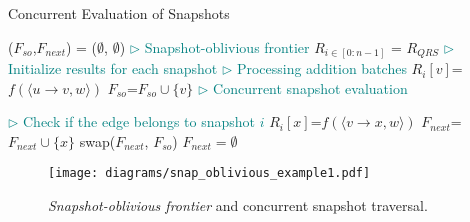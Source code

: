 \begin{algorithm}[t]
\caption{Concurrent Evaluation of Snapshots}
\label{algo:concurrent-snapshot}
\begin{algorithmic}[1]
\fontsize{8}{8.5}
\selectfont
{}
\State ($F_{so}$,$F_{next}$) = ($\emptyset$, $\emptyset$) \textcolor{teal}{ $\rhd$  Snapshot-oblivious frontier }
\State $R_{i\in [0:n-1]}$ = $R_{QRS}$ \textcolor{teal}{ $\rhd$  Initialize results for each snapshot  }
 \textcolor{teal}{ $\rhd$  Processing addition batches } \label{line:inc_add_0}
    \State $R_i[v]$=$f(\langle u\rightarrow v, w\rangle)$
    \State $F_{so}$=$F_{so}\cup\{v\}$
\EndIf
\EndParFor
\EndParFor\label{line:inc_add_1}
\textcolor{teal}{$\rhd$ Concurrent snapshot evaluation }
 \label{line:snapshot_oblivious}
 \label{line:concurrent_eval_0}

\hspace{0.5in}\textcolor{teal}{ $\rhd$ Check if the edge belongs to snapshot $i$ }
    \State $R_i[x]$=$f(\langle v\rightarrow x, w\rangle)$
    \State $F_{next}$=$F_{next}\cup\{x\}$
\EndIf
\EndIf
\EndFor
\EndFor
\EndParFor\label{line:concurrent_eval_1}
\State swap($F_{next}$, $F_{so}$)
\State $F_{next}=\emptyset$
\EndWhile
\State {}
\EndFunction
\end{algorithmic}
\end{algorithm}

\begin{figure}[h]
    \centering
    \texttt{[image: diagrams/snap\_oblivious\_example1.pdf]}
    \vspace{-0.1in}
    \caption{\emph{Snapshot-oblivious frontier} and concurrent snapshot traversal.}
    \label{fig:sof_example}
\vspace{-0.15in}
\end{figure}


